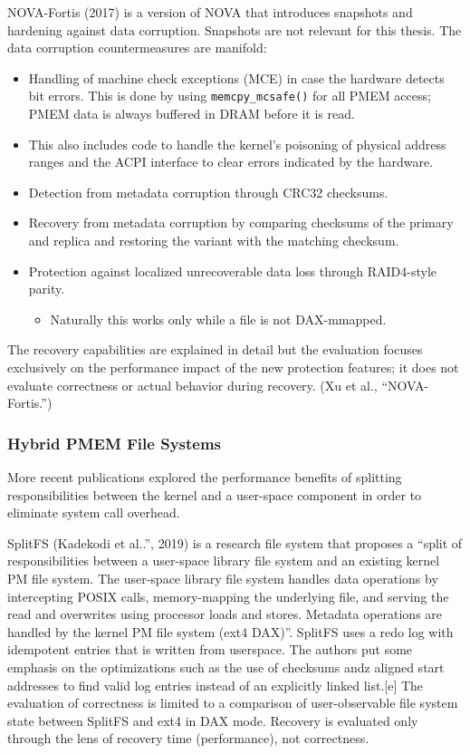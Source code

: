 \documentclass[12pt,a4paper,twoside,draft]{book}
\begin{document}
NOVA-Fortis (2017) is a version of NOVA that introduces snapshots and hardening against data corruption. Snapshots are not relevant for this thesis. The data corruption countermeasures are manifold:
\begin{itemize}[noitemsep]
    \item Handling of machine check exceptions (MCE) in case the hardware detects bit errors. This is done by using \lstinline{memcpy_mcsafe()} for all PMEM access; PMEM data is always buffered in DRAM before it is read.

    \item This also includes code to handle the kernel’s poisoning of physical address ranges and the ACPI interface to clear errors indicated by the hardware.

    \item Detection from metadata corruption through CRC32 checksums.
    \item Recovery from metadata corruption by comparing checksums of the primary and replica and restoring the variant with the matching checksum.
    \item Protection against localized unrecoverable data loss through RAID4-style parity.
    \begin{itemize}[noitemsep]
        \item Naturally this works only while a file is not DAX-mmapped.
    \end{itemize}
\end{itemize}
The recovery capabilities are explained in detail but the evaluation focuses exclusively on the performance impact of the new protection features; it does not evaluate correctness or actual behavior during recovery. (Xu et al., “NOVA-Fortis.”)


\subsubsection{Hybrid PMEM File Systems}
More recent publications explored the performance benefits of splitting responsibilities between the kernel and a user-space component in order to eliminate system call overhead.

SplitFS (Kadekodi et al..”, 2019) is a research file system that proposes a “split of responsibilities between a user-space library file system and an existing kernel PM file system. The user-space library file system handles data operations by intercepting POSIX calls, memory-mapping the underlying file, and serving the read and overwrites using processor loads and stores. Metadata operations are handled by the kernel PM file system (ext4 DAX)”.
SplitFS uses a redo log with idempotent entries that is written from userspace. The authors put some emphasis on the optimizations such as the use of checksums andz aligned start addresses to find valid log entries instead of an explicitly linked list.[e]
The evaluation of correctness is limited to a comparison of user-observable file system state between SplitFS and ext4 in DAX mode. Recovery is evaluated only through the lens of recovery time (performance), not correctness.
\end{document}
